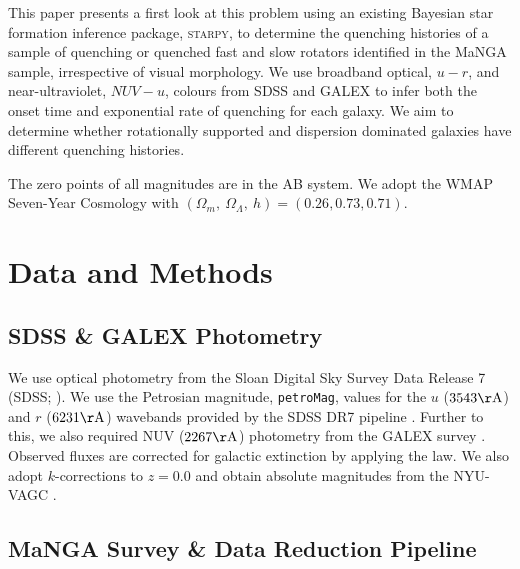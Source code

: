 \documentclass[useAMS,usenatbib]{mn2e}
\begin{document}
This paper presents a first look at this problem using an existing Bayesian star formation inference package, \textsc{starpy}, to determine the quenching histories of a sample of quenching or quenched fast and slow rotators identified in the MaNGA sample, irrespective of visual morphology. We use broadband optical, $u-r$, and near-ultraviolet, $NUV-u$, colours from SDSS and GALEX to infer both the onset time and exponential rate of quenching for each galaxy. We aim to determine whether rotationally supported and dispersion dominated galaxies have different quenching histories. 

The zero points of all magnitudes are in the AB system. We adopt the WMAP Seven-Year Cosmology \citep{jarosik11} with $(\Omega_m , ~\Omega_\Lambda , ~h) = (0.26, 0.73, 0.71)$.



\section{Data and Methods}\label{sec:datamethods}

\subsection{SDSS \& GALEX Photometry}\label{sec:photom}

We use optical photometry from the Sloan Digital Sky Survey Data Release 7 (SDSS; \citealt{york00, abazajian09}). We use the Petrosian magnitude, {\tt petroMag}, values for the $u$ ($3543 \rm{\AA}$) and $r$ ($6231 \rm{\AA}$) wavebands provided by the SDSS DR7 pipeline \citep{stoughton02}. Further to this, we also required NUV ($2267 \rm{\AA}$) photometry from the GALEX survey \citep{martin05}. Observed fluxes are corrected for galactic extinction \citep{Oh11} by applying the \citet*{Cardelli89} law. We also adopt $k$-corrections to $z = 0.0$ and obtain absolute magnitudes from the NYU-VAGC \citep{blanton05, padmanabhan08, blanton07}.

\subsection{MaNGA Survey \& Data Reduction Pipeline}\label{sec:manga}
\end{document}
